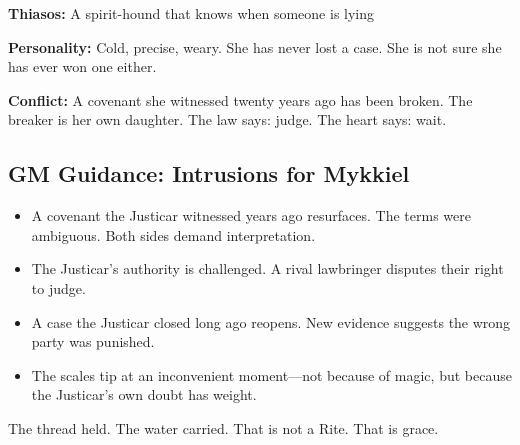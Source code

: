 \textbf{Thiasos:} A spirit-hound that knows when someone is lying

\textbf{Personality:} Cold, precise, weary. She has never lost a case. She is not sure she has ever won one either.

\textbf{Conflict:} A covenant she witnessed twenty years ago has been broken. The breaker is her own daughter. The law says: judge. The heart says: wait.

\subsection{GM Guidance: Intrusions for Mykkiel}

\begin{itemize}
\item A covenant the Justicar witnessed years ago resurfaces. The terms were ambiguous. Both sides demand interpretation.
\item The Justicar's authority is challenged. A rival lawbringer disputes their right to judge.
\item A case the Justicar closed long ago reopens. New evidence suggests the wrong party was punished.
\item The scales tip at an inconvenient moment—not because of magic, but because the Justicar's own doubt has weight.
\end{itemize}

The thread held. The water carried. That is not a Rite. That is grace.
